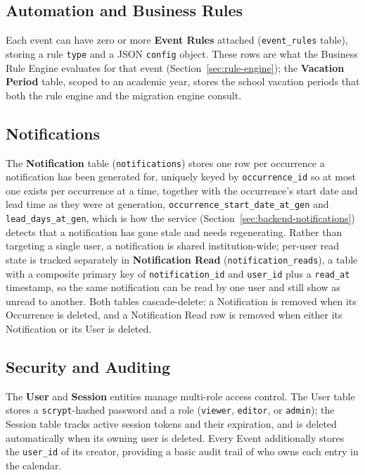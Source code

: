 \subsection{Automation and Business Rules} \label{sec:automation-entities}

Each event can have zero or more \textbf{Event Rules} attached (\texttt{event\_rules} table), storing a rule \texttt{type} and a JSON \texttt{config} object. These rows are what the Business Rule Engine evaluates for that event (Section~\ref{sec:rule-engine}); the \textbf{Vacation Period} table, scoped to an academic year, stores the school vacation periods that both the rule engine and the migration engine consult.

\subsection{Notifications} \label{sec:notification-entities}

The \textbf{Notification} table (\texttt{notifications}) stores one row per occurrence a notification has been generated for, uniquely keyed by \texttt{occurrence\_id} so at most one exists per occurrence at a time, together with the occurrence's start date and lead time as they were at generation, \texttt{occurrence\_start\_date\_at\_gen} and \texttt{lead\_days\_at\_gen}, which is how the service (Section~\ref{sec:backend-notifications}) detects that a notification has gone stale and needs regenerating. Rather than targeting a single user, a notification is shared institution-wide; per-user read state is tracked separately in \textbf{Notification Read} (\texttt{notification\_reads}), a table with a composite primary key of \texttt{notification\_id} and \texttt{user\_id} plus a \texttt{read\_at} timestamp, so the same notification can be read by one user and still show as unread to another. Both tables cascade-delete: a Notification is removed when its Occurrence is deleted, and a Notification Read row is removed when either its Notification or its User is deleted.

\subsection{Security and Auditing} \label{sec:security-entities}

The \textbf{User} and \textbf{Session} entities manage multi-role access control. The User table stores a \texttt{scrypt}-hashed password and a role (\texttt{viewer}, \texttt{editor}, or \texttt{admin}); the Session table tracks active session tokens and their expiration, and is deleted automatically when its owning user is deleted. Every Event additionally stores the \texttt{user\_id} of its creator, providing a basic audit trail of who owns each entry in the calendar.

